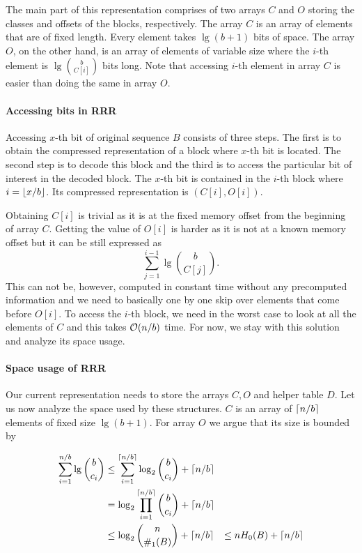 The main part of this representation comprises of two arrays $C$ and $O$ storing the classes and offsets of
the blocks, respectively. The array $C$ is an array of elements that are of fixed length. Every element takes
$\lg (b+1)$ bits of space. The array $O$, on the other hand, is an array of elements of variable
size where the $i$-th element is $\lg {b\choose C[i]}$ bits long. Note that accessing $i$-th element
in array $C$ is easier than doing the same in array $O$.

\paragraph{Accessing bits in RRR}

Accessing $x$-th bit of original sequence $B$ consists of three steps. The first is to obtain the
compressed representation of a block where $x$-th bit is located. The second step is to decode this block and
the third is to access the particular bit of interest in the decoded block. The $x$-th bit is contained in the
$i$-th block where $i=\left\lfloor x/b \right\rfloor$. Its compressed representation is $(C[i], O[i])$.

Obtaining $C[i]$ is trivial as it is at the fixed memory offset from the beginning of array $C$. Getting the
value of $O[i]$ is harder as it is not at a known memory offset but it can be still expressed as
$$\sum_{j=1}^{i-1} \lg {b\choose C[j]}.$$ This can not be, however, computed in constant time without
any precomputed information and we need to basically one by one skip over elements that come before $O[i]$.
To access the $i$-th block, we need in the worst case to look at all the elements of $C$ and this
takes $\mathcal{O}(n/b)$ time. For now, we stay with this solution and analyze its space usage.

\paragraph{Space usage of RRR}

Our current representation needs to store the arrays $C, O$ and helper table $D$. Let us now
analyze the space used by these structures. $C$ is an array of $\left\lceil n/b \right\rceil$ elements of fixed size
$\lg (b+1)$. For array $O$ we argue that its size is bounded by

\begin{align*}
    \sum_{i=1}^{n/b} \mathop{\mathrm{lg}} {b\choose c_i}
    &\leq \sum_{i=1}^{\left\lceil n/b \right\rceil} \log_2 {b\choose c_i} + \left\lceil n/b \right\rceil \\
    &= \log_2\prod_{i=1}^{\left\lceil n/b \right\rceil} {b\choose c_i} + \left\lceil n/b \right\rceil \\
    &\leq \log_2{n\choose \#_1(B)} + \left\lceil n/b \right\rceil &\leq nH_0(B) + \left\lceil n/b \right\rceil
\end{align*}

